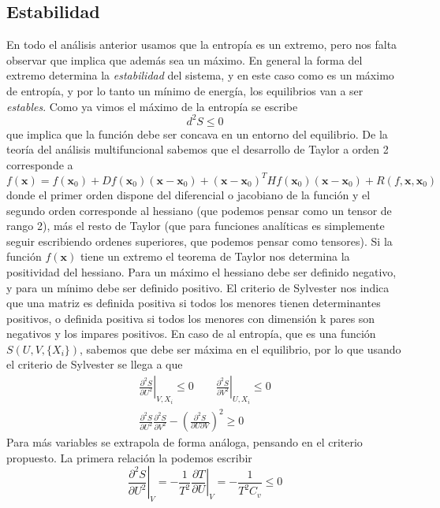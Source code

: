 \subsection{Estabilidad}
En todo el análisis anterior usamos que la entropía es un extremo, pero nos falta observar que implica que además sea un máximo.
En general la forma del extremo determina la \emph{estabilidad} del sistema, y en este caso como es un máximo de entropía, y por lo tanto un mínimo de energía, los equilibrios van a ser \emph{estables}.
Como ya vimos el máximo de la entropía se escribe
\[d^2 S \leq 0\]
que implica que la función debe ser concava en un entorno del equilibrio.
De la teoría del análisis multifuncional sabemos que el desarrollo de Taylor a orden 2 corresponde a
\[ f(\textbf{x}) = f(\textbf{x}_0) + Df(\textbf{x}_0) (\textbf{x} - \textbf{x}_0) + (\textbf{x} - \textbf{x}_0)^{T} Hf(\textbf{x}_0) (\textbf{x} - \textbf{x}_0) + R(f, \textbf{x},\textbf{x}_0)\]
donde el primer orden dispone del diferencial o jacobiano de la función y el segundo orden corresponde al hessiano (que podemos pensar como un tensor de rango 2), más el resto de Taylor (que para funciones analíticas es simplemente seguir escribiendo ordenes superiores, que podemos pensar como tensores).
Si la función $f(\textbf{x})$ tiene un extremo el teorema de Taylor nos determina la positividad del hessiano.
Para un máximo el hessiano debe ser definido negativo, y para un mínimo debe ser definido positivo.
El criterio de Sylvester nos indica que una matriz es definida positiva si todos los menores tienen determinantes positivos, o definida positiva si todos los menores con dimensión k pares son negativos y los impares positivos.
En caso de al entropía, que es una función $S(U,V,\{X_i\})$, sabemos que debe ser máxima en el equilibrio, por lo que usando el criterio de Sylvester se llega a que
\begin{equation}
\begin{gathered}
\left.\frac{\partial^2 S}{\partial U^2}\right|_{V,X_i} \leq 0 \qquad
\left.\frac{\partial^2 S}{\partial V^2}\right|_{U,X_i} \leq 0\\
\frac{\partial^2 S}{\partial U^2} \frac{\partial^2 S}{\partial V^2} - \left(\frac{\partial^2 S}{\partial U \partial V}\right)^2 \geq 0
\end{gathered}
\end{equation}
Para más variables se extrapola de forma análoga, pensando en el criterio propuesto.
La primera relación la podemos escribir
\[\left.\frac{\partial^2 S}{\partial U^2}\right|_V = - \frac{1}{T^2} \left.\frac{\partial T}{\partial U}\right|_V = - \frac{1}{T^2 C_v} \leq 0\]
